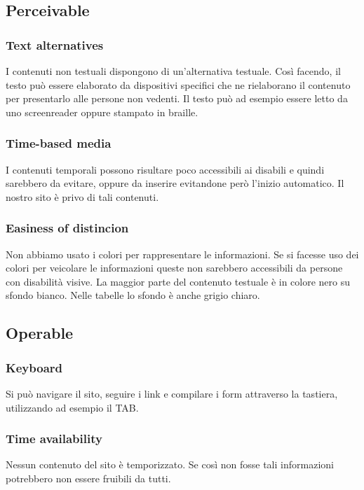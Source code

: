 \documentclass[10pt, a4paper]{article}
\begin{document}
	\subsection{Perceivable}
		\subsubsection{Text alternatives}
		I contenuti non testuali dispongono di un'alternativa testuale. Così facendo, il testo può essere elaborato da dispositivi specifici che ne rielaborano il contenuto per presentarlo alle persone non vedenti. Il testo può ad esempio essere letto da uno screenreader oppure stampato in braille.
		
		\subsubsection{Time-based media}
		I contenuti temporali possono risultare poco accessibili ai disabili e quindi sarebbero da evitare, oppure da inserire evitandone però l'inizio automatico. Il nostro sito è privo di tali contenuti.
		
		\subsubsection{Easiness of distincion}
		Non abbiamo usato i colori per rappresentare le informazioni. Se si facesse uso dei colori per veicolare le informazioni queste non sarebbero accessibili da persone con disabilità visive. La maggior parte del contenuto testuale è in colore nero su sfondo bianco. Nelle tabelle lo sfondo è anche grigio chiaro.
	
	\subsection{Operable}
		\subsubsection{Keyboard}
		Si può navigare il sito, seguire i link e compilare i form attraverso la tastiera, utilizzando ad esempio il TAB.
		
		\subsubsection{Time availability}
		Nessun contenuto del sito è temporizzato. Se così non fosse tali informazioni potrebbero non essere fruibili da tutti.
		
\end{document}
